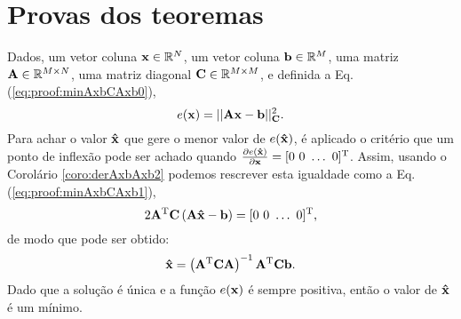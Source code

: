 \section{Provas dos teoremas}
 
\begin{myproofT}\label{proof:theo:minAxbCAxb}
Dados,
um vetor coluna $\VECTOR{x}\in \mathbb{R}^N$, 
um vetor coluna $\VECTOR{b}\in \mathbb{R}^M$,  
uma matriz $\MATRIX{A} \in \mathbb{R}^{M\times N}$, 
uma matriz diagonal $\MATRIX{C} \in \mathbb{R}^{M\times M}$, e 
definida a Eq. (\ref{eq:proof:minAxbCAxb0}),
\begin{equation}\label{eq:proof:minAxbCAxb0}
e(\VECTOR{x})=||\MATRIX{A}\VECTOR{x}-\VECTOR{b}||_{\MATRIX{C}}^2.
\end{equation}
Para achar o valor  $\VECTOR{\hat{x}}$ que gere o menor valor de $e(\VECTOR{\hat{x}})$, é aplicado
o critério que um ponto de inflexão pode ser achado quando 
$\frac{\partial e(\VECTOR{\hat{x}})}{\partial \VECTOR{x} }=[0~ 0~ \hdots~ 0 ]^{\transpose}$.
Assim, usando o Corolário \ref{coro:derAxbAxb2} podemos 
rescrever esta igualdade como a Eq. (\ref{eq:proof:minAxbCAxb1}),
\begin{equation}\label{eq:proof:minAxbCAxb1}
2 \MATRIX{A}^{\transpose}\MATRIX{C}\left(\MATRIX{A}\VECTOR{\hat{x}}-\VECTOR{b}\right)=[0~ 0~ \hdots~ 0 ]^{\transpose},
\end{equation}
de modo que pode ser obtido:
\begin{equation}\label{eq:proof:minAxbCAxb2}
\VECTOR{\hat{x}}=\left( \MATRIX{A}^{\transpose}\MATRIX{C}\MATRIX{A} \right)^{-1} \MATRIX{A}^{\transpose}\MATRIX{C} \VECTOR{b}.
\end{equation}
Dado que a solução é única e a função $e(\VECTOR{x})$ é sempre positiva, então
o valor de $\VECTOR{\hat{x}}$ é um mínimo.
\end{myproofT}

